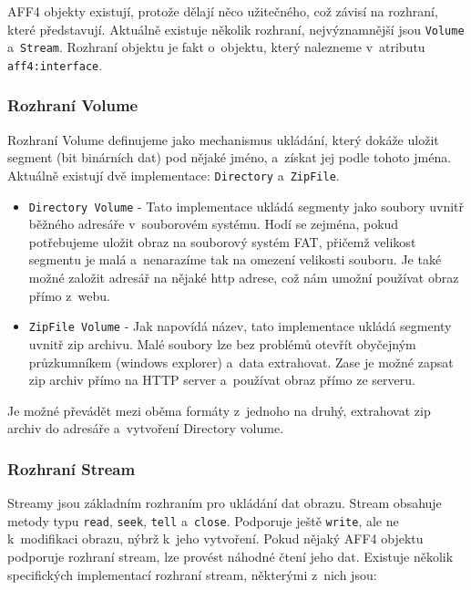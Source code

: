 \noindent AFF4 objekty existují, protože dělají něco užitečného, což závisí na rozhraní, které představují. Aktuálně existuje několik rozhraní, nejvýznamnější jsou \texttt{Volume} a~\texttt{Stream}. Rozhraní objektu je fakt o~objektu, který nalezneme v~atributu \texttt{aff4:interface}.

\subsubsection{Rozhraní Volume}
Rozhraní Volume definujeme jako mechanismus ukládání, který dokáže uložit segment (bit binárních dat) pod nějaké jméno, a~získat jej podle tohoto jména. Aktuálně existují dvě implementace: \texttt{Directory} a~\texttt{ZipFile}.

\begin{itemize}
\item \texttt{Directory Volume} - Tato implementace ukládá segmenty jako soubory uvnitř běžného adresáře v~souborovém systému. Hodí se zejména, pokud potřebujeme uložit obraz na souborový systém FAT, přičemž velikost segmentu je malá a~nenarazíme tak na omezení velikosti souboru. Je také možné založit adresář na nějaké http adrese, což nám umožní používat obraz přímo z~webu.

\item \texttt{ZipFile Volume} - Jak napovídá název, tato implementace ukládá segmenty uvnitř zip archivu. Malé soubory lze bez problémů otevřít obyčejným průzkumníkem (windows explorer) a~data extrahovat. Zase je možné zapsat zip archiv přímo na HTTP server a~používat obraz přímo ze serveru.
\end{itemize}

\noindent Je možné převádět mezi oběma formáty z~jednoho na druhý, extrahovat zip archiv do adresáře a~vytvoření Directory volume.

\subsubsection{Rozhraní Stream}
Streamy jsou základním rozhraním pro ukládání dat obrazu. Stream obsahuje metody typu \texttt{read}, \texttt{seek}, \texttt{tell} a~\texttt{close}. Podporuje ještě \texttt{write}, ale ne k~modifikaci obrazu, nýbrž k~jeho vytvoření. Pokud nějaký AFF4 objektu podporuje rozhraní stream, lze provést náhodné čtení jeho dat. Existuje několik specifických implementací rozhraní stream, některými z~nich jsou:

